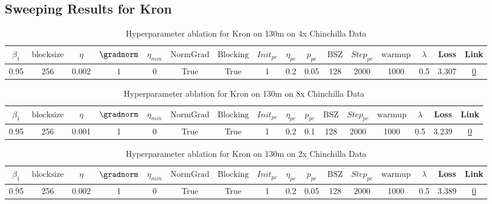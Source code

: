 \subsection{Sweeping Results for Kron}%
\begin{table}[H]
\centering
\caption{Hyperparameter ablation for Kron on 130m on 4x Chinchilla Data}
\label{tab:ablation_kron_130m_4}
\begin{tabular}{cccccccccccccccc}
\toprule
$\beta_1$ & $\mathrm{block size}$ & $\eta$ & $\gradnorm$ & $\eta_{min}$ & $\mathrm{NormGrad}$ & $\mathrm{Blocking}$ & $Init_{pc}$ & $\eta_{pc}$ & $p_{pc}$ & $\mathrm{BSZ}$ & $Step_{pc}$ & $\mathrm{warmup}$ & $\lambda$ & Loss & Link \\
\midrule
0.95 & 256 & 0.002 & 1 & 0 & True & True & 1 & 0.2 & 0.05 & 128 & 2000 & 1000 & 0.5 & 3.307 & \href{https://wandb.ai/stanford-mercury/optimizer-scaling/runs/sweep-130m-10B-kronm1a1c3blr0.002-wd0.5-b10.95-plr0.2-pis1-gn1-n-b8692a}{0} \\
\midrule
\bottomrule
\end{tabular}
\end{table}

\begin{table}[H]
\centering
\caption{Hyperparameter ablation for Kron on 130m on 8x Chinchilla Data}
\label{tab:ablation_kron_130m_8}
\begin{tabular}{cccccccccccccccc}
\toprule
$\beta_1$ & $\mathrm{block size}$ & $\eta$ & $\gradnorm$ & $\eta_{min}$ & $\mathrm{NormGrad}$ & $\mathrm{Blocking}$ & $Init_{pc}$ & $\eta_{pc}$ & $p_{pc}$ & $\mathrm{BSZ}$ & $Step_{pc}$ & $\mathrm{warmup}$ & $\lambda$ & Loss & Link \\
\midrule
0.95 & 256 & 0.001 & 1 & 0 & True & True & 1 & 0.2 & 0.1 & 128 & 2000 & 1000 & 0.5 & 3.239 & \href{https://wandb.ai/stanford-mercury/optimizer-scaling/runs/sweep-130m-21B-kronz680ae4lr0.001-wd0.5-b10.95-plr0.2-pis1-gn1-n-f84dac}{0} \\
\midrule
\bottomrule
\end{tabular}
\end{table}

\begin{table}[H]
\centering
\caption{Hyperparameter ablation for Kron on 130m on 2x Chinchilla Data}
\label{tab:ablation_kron_130m_2}
\begin{tabular}{cccccccccccccccc}
\toprule
$\beta_1$ & $\mathrm{block size}$ & $\eta$ & $\gradnorm$ & $\eta_{min}$ & $\mathrm{NormGrad}$ & $\mathrm{Blocking}$ & $Init_{pc}$ & $\eta_{pc}$ & $p_{pc}$ & $\mathrm{BSZ}$ & $Step_{pc}$ & $\mathrm{warmup}$ & $\lambda$ & Loss & Link \\
\midrule
0.95 & 256 & 0.002 & 1 & 0 & True & True & 1 & 0.2 & 0.05 & 128 & 2000 & 1000 & 0.5 & 3.389 & \href{https://wandb.ai/stanford-mercury/optimizer-scaling/runs/sweep-130m-5B-kron45d4b7lr0.002-wd0.5-b10.95-plr0.2-pis1-gn1-nor-c54de5}{0} \\
\midrule
\bottomrule
\end{tabular}
\end{table}

